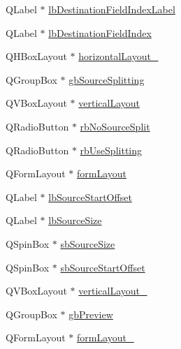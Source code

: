 \begin{DoxyCompactItemize}
\item 
Q\-Label $\ast$ \hyperlink{class_ui__mdt_field_map_item_dialog_ab5331766ed61e953ee49b3e06555f174}{lb\-Destination\-Field\-Index\-Label}
\item 
Q\-Label $\ast$ \hyperlink{class_ui__mdt_field_map_item_dialog_ad123d6533ba01097e241e0ad26cc01de}{lb\-Destination\-Field\-Index}
\item 
Q\-H\-Box\-Layout $\ast$ \hyperlink{class_ui__mdt_field_map_item_dialog_a0a493718783e5f100c327f28a8744627}{horizontal\-Layout\-\_}
\item 
Q\-Group\-Box $\ast$ \hyperlink{class_ui__mdt_field_map_item_dialog_a060e5226c2b396395607a633b7a43f14}{gb\-Source\-Splitting}
\item 
Q\-V\-Box\-Layout $\ast$ \hyperlink{class_ui__mdt_field_map_item_dialog_a055ad6e04145a347caad4052c37613ad}{vertical\-Layout}
\item 
Q\-Radio\-Button $\ast$ \hyperlink{class_ui__mdt_field_map_item_dialog_abb6702d4d4dc9e75691055e65e0a5a6c}{rb\-No\-Source\-Split}
\item 
Q\-Radio\-Button $\ast$ \hyperlink{class_ui__mdt_field_map_item_dialog_a1714ffa5ad18b098ed6a36dd67c178fb}{rb\-Use\-Splitting}
\item 
Q\-Form\-Layout $\ast$ \hyperlink{class_ui__mdt_field_map_item_dialog_a70b660e5e042b03908d013fef4bb9437}{form\-Layout}
\item 
Q\-Label $\ast$ \hyperlink{class_ui__mdt_field_map_item_dialog_a8de120900000467db01cd104bf28904b}{lb\-Source\-Start\-Offset}
\item 
Q\-Label $\ast$ \hyperlink{class_ui__mdt_field_map_item_dialog_a6e0ff737d4394a56c61db6c6acbf9912}{lb\-Source\-Size}
\item 
Q\-Spin\-Box $\ast$ \hyperlink{class_ui__mdt_field_map_item_dialog_a26f031167698cd4079a7862b6b6a9cb1}{sb\-Source\-Size}
\item 
Q\-Spin\-Box $\ast$ \hyperlink{class_ui__mdt_field_map_item_dialog_a9c8f4b9659e57c4af734d2c4b4750cbf}{sb\-Source\-Start\-Offset}
\item 
Q\-V\-Box\-Layout $\ast$ \hyperlink{class_ui__mdt_field_map_item_dialog_a82853f9f0f0dd223a85acd1d02e3a913}{vertical\-Layout\-\_}
\item 
Q\-Group\-Box $\ast$ \hyperlink{class_ui__mdt_field_map_item_dialog_a1af87d49353d444fd572b41865952f2b}{gb\-Preview}
\item 
Q\-Form\-Layout $\ast$ \hyperlink{class_ui__mdt_field_map_item_dialog_a010f84c75b657df551a246d9578ce88a}{form\-Layout\-\_}
\item 

\end{DoxyCompactItemize}
